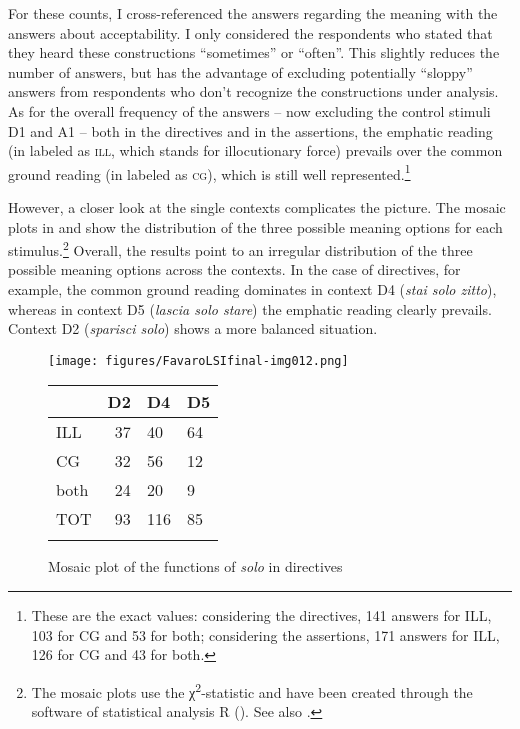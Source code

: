 For these counts, I cross-referenced the answers regarding the meaning with the answers about acceptability. I only considered the respondents who stated that they heard these constructions “sometimes” or “often”. This slightly reduces the number of answers, but has the advantage of excluding potentially “sloppy” answers from respondents who don’t recognize the constructions under analysis. As for the overall frequency of the answers – now excluding the control stimuli D1 and A1 – both in the directives and in the assertions, the emphatic reading (in  labeled as \textsc{ill}, which stands for illocutionary force) prevails over the common ground reading (in  labeled as \textsc{cg}), which is still well represented.\footnote{These are the exact values: considering the directives, 141 answers for ILL, 103 for CG and 53 for both; considering the assertions, 171 answers for ILL, 126 for CG and 43 for both.}

However, a closer look at the single contexts complicates the picture. The mosaic plots in  and  show the distribution of the three possible meaning options for each stimulus.\footnote{The mosaic plots use the χ\textsuperscript{2}{}-statistic and have been created through the software of statistical analysis R (\citealt{R_core_team2020}). See also \citet[199–222]{Levshina2015}.} Overall, the results point to an irregular distribution of the three possible meaning options across the contexts. In the case of directives, for example, the common ground reading dominates in context D4 (\textit{stai solo zitto}), whereas in context D5 (\textit{lascia solo stare}) the emphatic reading clearly prevails. Context D2 (\textit{sparisci solo}) shows a more balanced situation.

\vfill
\begin{figure}[H]
 \texttt{[image: figures/FavaroLSIfinal-img012.png]}


\begin{tabularx}{.6\textwidth}{XrYY}
\lsptoprule
 & D2 & D4 & D5\\
 \midrule
 ILL & 37 & 40 & 64\\
 CG & 32 & 56 & 12\\
 both & 24 & 20 & 9\\
 TOT & 93 & 116 & 85\\
\lspbottomrule
\end{tabularx}
\caption{ Mosaic plot of the functions of \textit{solo} in directives}
\label{fig:key:8.12}
\end{figure}
\vfill
\pagebreak

